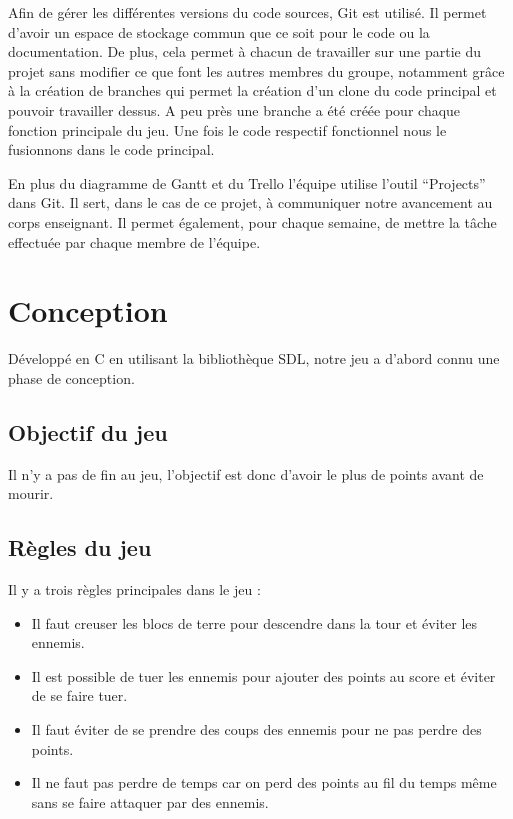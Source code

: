 \documentclass[a4paper,12pt]{article}
\begin{document}
Afin de gérer les différentes versions du code sources, Git est utilisé. 
Il permet d’avoir un espace de stockage commun que ce soit pour le code ou la documentation. De plus, cela permet à chacun de travailler sur une partie du projet sans modifier ce que font les autres membres du groupe, notamment grâce à la création de branches qui permet la création d'un clone du code principal et pouvoir travailler dessus. 
A peu près une branche a été créée pour chaque fonction principale du jeu. Une fois le code respectif fonctionnel nous le fusionnons dans le code principal.

En plus du diagramme de Gantt et du Trello l’équipe utilise l’outil “Projects” dans Git. 
Il sert, dans le cas de ce projet, à communiquer notre avancement au corps enseignant. 
Il permet également, pour chaque semaine, de mettre la tâche effectuée par chaque membre de l’équipe.



\section{Conception}

Développé en C en utilisant la bibliothèque SDL, notre jeu a d'abord connu une phase de conception.

\subsection{Objectif du jeu}
Il n’y a pas de fin au jeu, l’objectif est  donc d’avoir le plus de points avant de mourir.

\subsection{Règles du jeu}
Il y a trois règles principales dans le jeu :
\begin{itemize}
	\item Il faut creuser les blocs de terre pour descendre dans la tour et éviter les ennemis.
	\item Il est possible de tuer les ennemis pour ajouter des points au score et éviter de se faire tuer.
	\item Il faut éviter de se prendre des coups des ennemis pour ne pas perdre des points.
	\item Il ne faut pas perdre de temps car on perd des points au fil du temps même sans se faire attaquer par des ennemis. 
\end{itemize}
\end{document}
